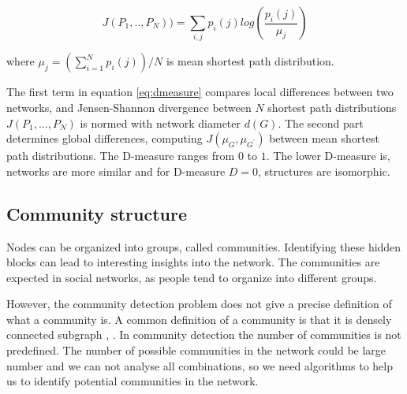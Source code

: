\begin{equation}
J(P_1,.., P_N)) = \sum_{i,j}p_i(j)log(\frac{p_i(j)}{\mu_j})
\end{equation}

where  $\mu_j = (\sum_{i=1}^N p_i(j))/N$ is mean shortest path distribution.


The first term in equation \ref{eq:dmeasure} compares local differences between two networks, and Jensen-Shannon divergence between $N$ shortest path distributions $J(P_{1},...,P_{N})$ is normed with network diameter $d(G)$. The second part determines global differences, computing  ${J(\mu_{G},\mu_{G^{'}})}$ between mean shortest path distributions. 
The D-measure ranges from $0$ to $1$. The lower D-measure is, networks are more similar and for D-measure $D = 0$, structures are isomorphic.


\subsection{Community structure}

Nodes can be organized into groups, called communities. Identifying these hidden blocks can lead to interesting insights into the network. The communities are expected in social networks, as people tend to organize into different groups.  

However, the community detection problem does not give a precise definition of what a community is. A common definition of a community is that it is densely connected subgraph \cite{userguide}, \cite{martin}.  In community detection the number of communities is not predefined. The number of possible communities in the network could be large number and we can not analyse all combinations, so we need algorithms to help us to identify potential communities in the network. 

